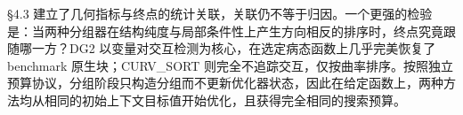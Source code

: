 §4.3 建立了几何指标与终点的统计关联，关联仍不等于归因。一个更强的检验是：当两种分组器在结构纯度与局部条件性上产生方向相反的排序时，终点究竟跟随哪一方？DG2 以变量对交互检测为核心，在选定病态函数上几乎完美恢复了 benchmark 原生块；CURV\_SORT 则完全不追踪交互，仅按曲率排序。按照独立预算协议，分组阶段只构造分组而不更新优化器状态，因此在给定函数上，两种方法均从相同的初始上下文目标值开始优化，且获得完全相同的搜索预算。
